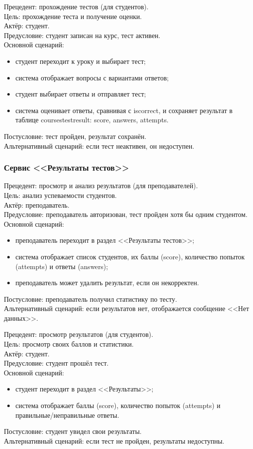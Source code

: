 {Прецедент: прохождение тестов (для студентов)}. \\
{Цель}: прохождение теста и получение оценки. \\
{Актёр}: студент. \\
{Предусловие}: студент записан на курс, тест активен. \\
{Основной сценарий}:
\begin{itemize}
	\item студент переходит к уроку и выбирает тест;
	\item система отображает вопросы с вариантами ответов;
	\item студент выбирает ответы и отправляет тест;
	\item система оценивает ответы, сравнивая с iscorrect, и сохраняет результат в таблице coursestestresult: score, answers, attempts.
\end{itemize}
{Постусловие}: тест пройден, результат сохранён. \\
{Альтернативный сценарий}: если тест неактивен, он недоступен.

\subsubsection{Сервис <<Результаты тестов>>}

{Прецедент: просмотр и анализ результатов (для преподавателей)}. \\
{Цель}: анализ успеваемости студентов. \\
{Актёр}: преподаватель. \\
{Предусловие}: преподаватель авторизован, тест пройден хотя бы одним студентом. \\
{Основной сценарий}:
\begin{itemize}
	\item преподаватель переходит в раздел <<Результаты тестов>>;
	\item система отображает список студентов, их баллы (score), количество попыток (attempts) и ответы (answers);
	\item преподаватель может удалить результат, если он некорректен.
\end{itemize}
{Постусловие}: преподаватель получил статистику по тесту. \\
{Альтернативный сценарий}: если результатов нет, отображается сообщение <<Нет данных>>.

{Прецедент: просмотр результатов (для студентов)}. \\
{Цель}: просмотр своих баллов и статистики. \\
{Актёр}: студент. \\
{Предусловие}: студент прошёл тест. \\
{Основной сценарий}:
\begin{itemize}
	\item студент переходит в раздел <<Результаты>>;
	\item система отображает баллы (score), количество попыток (attempts) и правильные/неправильные ответы.
\end{itemize}
{Постусловие}: студент увидел свои результаты. \\
{Альтернативный сценарий}: если тест не пройден, результаты недоступны.

